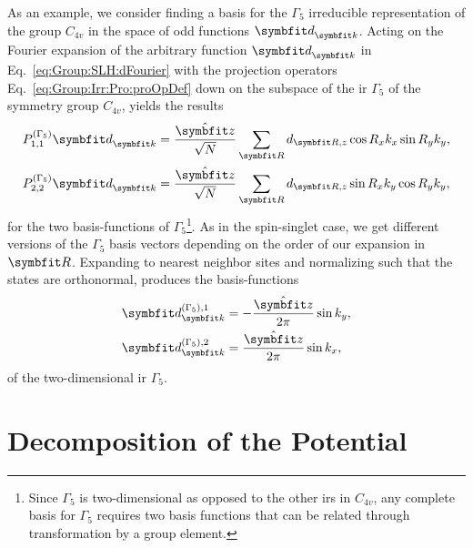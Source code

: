 As an example, we consider finding a basis for the $\Gamma_5$ irreducible representation of the group $C_{4v}$ in the space of odd functions $\v{d}_\v{k}$.
Acting on the Fourier expansion of the arbitrary function $\v{d}_\v{k}$ in Eq.~\eqref{eq:Group:SLH:dFourier} with the projection operators Eq.~\eqref{eq:Group:Irr:Pro:proOpDef}
down on the subspace of the \ac{ir} $\Gamma_5$ of the symmetry group $C_{4v}$, yields the results
\begin{subequations}
    \label{eq:Group:SLH:odd:projections}
    \begin{align}
        \label{eq:Group:SLH:odd:projections:1}
        P_{1,1}^{(\Gamma_5)}\v{d}_\v{k} &= \frac{\hat{\v{z}}}{\sqrt{N}}\sum_\v{R}d_{\v{R},z}\cos R_xk_x \sin R_yk_y,\\
        \label{eq:Group:SLH:odd:projections:2}
        P_{2,2}^{(\Gamma_5)}\v{d}_\v{k} &= \frac{\hat{\v{z}}}{\sqrt{N}}\sum_\v{R}d_{\v{R},z}\sin R_xk_y\cos R_yk_y,
    \end{align}
\end{subequations}
for the two basis-functions of $\Gamma_5$\footnote{Since $\Gamma_5$ is two-dimensional as opposed to the other \ac{ir}s in $C_{4v}$, any complete basis for $\Gamma_5$ requires two basis
functions that can be related through transformation by a group element.}. 
As in the spin-singlet case, we get different versions of the $\Gamma_5$ basis vectors depending on the order of our expansion in $\v{R}$.
Expanding to nearest neighbor sites and normalizing such that the states are orthonormal, produces the basis-functions
\begin{subequations}
    \label{eq:Group:SLH:odd:G5basis}
    \begin{align}
        \label{eq:Group:SLH:odd:G5basis:1}
        \v{d}^{(\Gamma_5),1}_\v{k} &= -\frac{\hat{\v{z}}}{2\pi}\sin k_y,\\
        \label{eq:Group:SLH:odd:G5basis:2}
        \v{d}^{(\Gamma_5),2}_\v{k} &= \frac{\hat{\v{z}}}{2\pi}\sin k_x,
    \end{align}
\end{subequations}
of the two-dimensional \ac{ir} $\Gamma_5$.

\section{Decomposition of the Potential}
\label{sec:Group:Potential}

